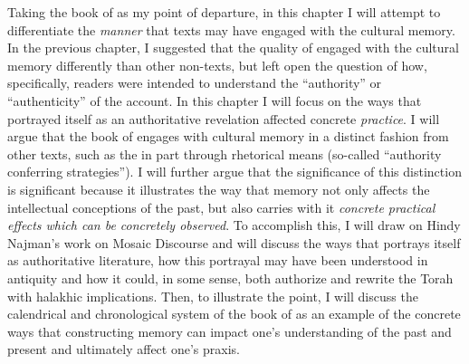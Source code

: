 Taking the book of \jub as my point of departure, in this chapter I will attempt to differentiate the \emph{manner} that \rwb texts may have engaged with the cultural memory. In the previous chapter, I suggested that the \psgraphical quality of \ga engaged with the cultural memory differently than other non-\psgraphical texts, but left open the question of how, specifically, readers were intended to understand the ``authority'' or ``authenticity'' of the account. In this chapter I will focus on the ways that \jub portrayed itself as an authoritative revelation affected concrete \emph{practice}. I will argue that the book of \jub engages with cultural memory in a distinct fashion from other texts, such as the \ga in part through rhetorical means (so-called ``authority conferring strategies''). I will further argue that the significance of this distinction is significant because it illustrates the way that memory not only affects the intellectual conceptions of the past, but also carries with it \emph{concrete practical effects which can be concretely observed}. To accomplish this, I will draw on Hindy Najman's work on Mosaic Discourse and will discuss the ways that \jub portrays itself as authoritative literature, how this portrayal may have been understood in antiquity and how it could, in some sense, both authorize and rewrite the Torah with halakhic implications. Then, to illustrate the point, I will discuss the calendrical and chronological system of the book of \jub as an example of the concrete ways that constructing memory can impact one's understanding of the past and present and ultimately affect one's praxis.

